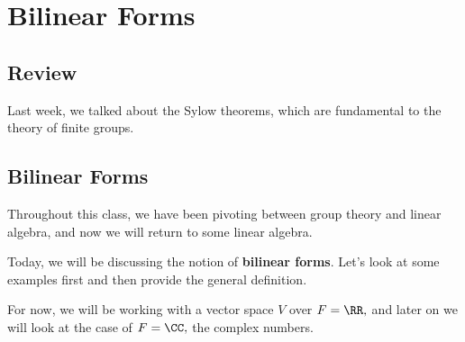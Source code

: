 
\section{Bilinear Forms}

\subsection{Review}
Last week, we talked about the Sylow theorems, which are fundamental to the theory of finite groups. 

\subsection{Bilinear Forms}
Throughout this class, we have been pivoting between group theory and linear algebra, and now we will return to some linear algebra.

Today, we will be discussing the notion of \textbf{bilinear forms}. Let's look at some examples first and then provide the general definition. 

For now, we will be working with a vector space $V$ over $F= \RR,$ and later on we will look at the case of $F = \CC,$ the complex numbers.

